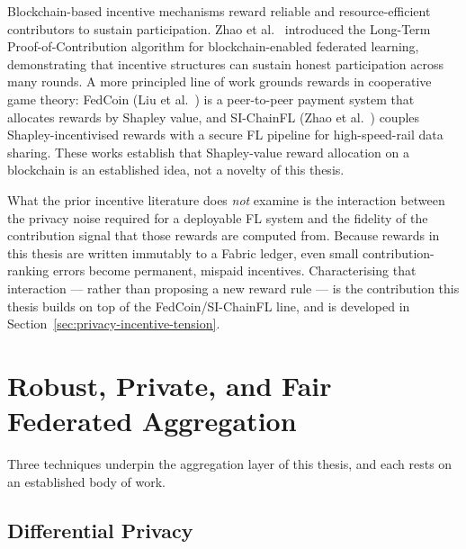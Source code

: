 Blockchain-based incentive mechanisms reward reliable and resource-efficient contributors to sustain participation. Zhao et al.~\cite{10529180} introduced the Long-Term Proof-of-Contribution algorithm for blockchain-enabled federated learning, demonstrating that incentive structures can sustain honest participation across many rounds. A more principled line of work grounds rewards in cooperative game theory: FedCoin (Liu et al.~\cite{fedcoin2020}) is a peer-to-peer payment system that allocates rewards by Shapley value, and SI-ChainFL (Zhao et al.~\cite{zhao2026sichainfl}) couples Shapley-incentivised rewards with a secure FL pipeline for high-speed-rail data sharing. These works establish that Shapley-value reward allocation on a blockchain is an established idea, not a novelty of this thesis.

What the prior incentive literature does \emph{not} examine is the interaction between the privacy noise required for a deployable FL system and the fidelity of the contribution signal that those rewards are computed from. Because rewards in this thesis are written immutably to a Fabric ledger, even small contribution-ranking errors become permanent, mispaid incentives. Characterising that interaction --- rather than proposing a new reward rule --- is the contribution this thesis builds on top of the FedCoin/SI-ChainFL line, and is developed in Section~\ref{sec:privacy-incentive-tension}.

\section{Robust, Private, and Fair Federated Aggregation}
\label{sec:robust-aggregation}

Three techniques underpin the aggregation layer of this thesis, and each rests on an established body of work.

\subsection{Differential Privacy}

